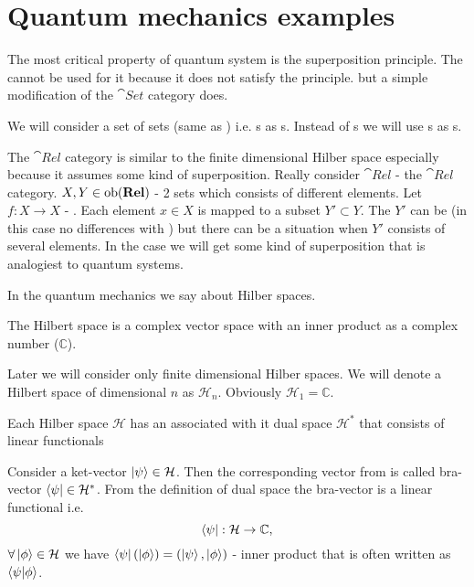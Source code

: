 \section{Quantum mechanics examples}
\label{sec:qmcategory_example}
The most critical property of quantum system is the superposition
principle. The  cannot be used for it
because it does not satisfy the principle. but a simple modification
of the $\cat{Set}$ category does. 
\begin{definition}
  \label{def:relcategory}
  We will consider a set of sets (same as )
  i.e. s as s. Instead of
  s we will use s as
  s. 

  The $\cat{Rel}$ category is similar to the finite dimensional
  Hilber space especially because it assumes some kind of superposition.
  Really consider $\cat{Rel}$ - the $\cat{Rel}$ category. $X, Y \in
  \mathrm{ob}(\mathbf{Rel})$ - 2 sets which consists of different elements. Let $f: X
  \to X$ - . Each element $x \in X$ is
  mapped to a subset $Y' \subset Y$. The $Y'$ can be
    (in this case no differences with
  ) but there can be a situation when $Y'$
  consists of several elements. In the case we will get some kind of
  superposition that is analogiest to quantum systems.
\end{definition}

In the quantum mechanics we say about Hilber spaces.
\begin{definition}
  \label{def:hilbert_space} The Hilbert space is a complex vector space
  with an inner product as a complex number ($\mathbb{C}$).

  Later we will consider only finite dimensional Hilber spaces.
  We will denote a Hilbert space of dimensional $n$ as
  $\mathcal{H}_n$. Obviously $\mathcal{H}_1 = \mathbb{C}$.
\end{definition}

\begin{definition}
\label{def:dual_space}
Each Hilber space $\mathcal{H}$ has an associated with it dual space
$\mathcal{H}^\ast$ that consists of linear functionals  
\end{definition}

\begin{example}
\label{ex:dirac_notation}
Consider a ket-vector $\ket{\psi} \in \mathcal{H}$. Then the
corresponding vector from  is called
bra-vector $\bra{\psi} \in \mathcal{H}^\ast$. From the definition of
dual space the bra-vector is a linear functional i.e. 
\[
\bra{\psi} : \mathcal{H} \to \mathbb{C},
\]
$\forall \ket{\phi} \in \mathcal{H}$ we have 
\(
\bra{\psi}\left(\ket{\phi}\right) = \left(\ket{\psi}, \ket{\phi}\right)
\) - inner product that is often written as $\bra{\psi}\ket{\phi}$.
\end{example}



